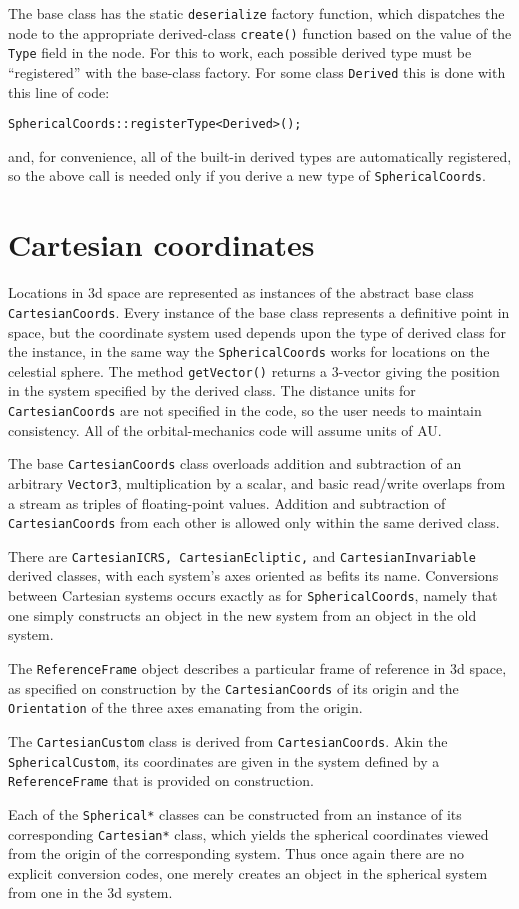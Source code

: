 \documentclass[11pt,preprint,flushrt]{aastex}
\begin{document}
The base class has the static \texttt{deserialize} factory function, which dispatches the node to the appropriate derived-class \texttt{create()} function based on the value of the \texttt{Type} field in the node.  For this to work, each possible derived type must be ``registered'' with the base-class factory.  For some class \texttt{Derived} this is done with this line of code:
\begin{verbatim}
SphericalCoords::registerType<Derived>();
\end{verbatim}
and, for convenience, all of the built-in derived types are automatically registered, so the above call is needed only if you derive a new type of \texttt{SphericalCoords}.


\section{Cartesian coordinates}
Locations in 3d space are represented as instances of the abstract base class {\tt CartesianCoords}. Every instance of the base class represents a definitive point in space, but the coordinate system used depends upon the type of derived class for the instance, in the same way the {\tt SphericalCoords} works for locations on the celestial sphere.  The method {\tt getVector()} returns a 3-vector giving the position in the system specified by the derived class.  The distance units for {\tt CartesianCoords} are not specified in the code, so the user needs to maintain consistency.  All of the orbital-mechanics code will assume units of AU.

The base \texttt{CartesianCoords} class overloads addition and subtraction of an arbitrary \texttt{Vector3},  multiplication by a scalar, and basic read/write overlaps from a stream as triples of floating-point values.  Addition and subtraction of \texttt{CartesianCoords} from each other is allowed only within the same derived class.

There are \texttt{CartesianICRS, CartesianEcliptic,} and \texttt{CartesianInvariable} derived classes, with each system's axes oriented as befits its name.  Conversions between Cartesian systems occurs exactly as for \texttt{SphericalCoords}, namely that one simply constructs an object in the new system from an object in the old system. 

The \texttt{ReferenceFrame} object describes a particular frame of reference in 3d space, as specified on construction by the \texttt{CartesianCoords} of its origin and the \texttt{Orientation} of the three axes emanating from the origin.  

The \texttt{CartesianCustom} class is derived from \texttt{CartesianCoords}.  Akin the \texttt{SphericalCustom}, its coordinates are given in the system defined by a \texttt{ReferenceFrame} that is provided on construction.

Each of the \texttt{Spherical*} classes can be constructed from an instance of its corresponding \texttt{Cartesian*} class, which yields the spherical coordinates viewed from the origin of the corresponding system.  Thus once again there are no explicit conversion codes, one merely creates an object in the spherical system from one in the 3d system.
\end{document}
